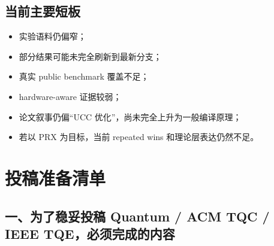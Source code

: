\documentclass[11pt]{article}
\begin{document}
\subsection{当前主要短板}
\begin{itemize}
    \item 实验语料仍偏窄；
    \item 部分结果可能未完全刷新到最新分支；
    \item 真实 public benchmark 覆盖不足；
    \item hardware-aware 证据较弱；
    \item 论文叙事仍偏“UCC 优化”，尚未完全上升为一般编译原理；
    \item 若以 PRX 为目标，当前 repeated wins 和理论层表达仍然不足。
\end{itemize}

\section{投稿准备清单}

\subsection{一、为了稳妥投稿 Quantum / ACM TQC / IEEE TQE，必须完成的内容}
\end{document}
